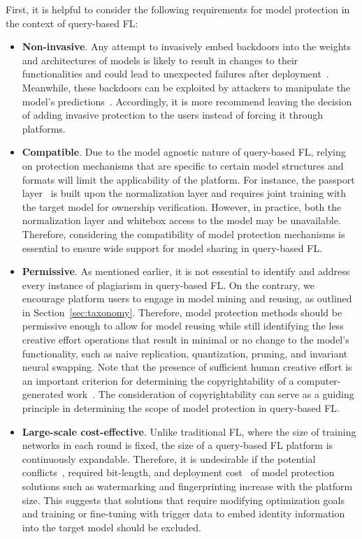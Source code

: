 First, it is helpful to consider the following requirements for model protection in the context of query-based FL:
\begin{itemize}
  \item \textbf{Non-invasive}. Any attempt to invasively embed backdoors into the weights and architectures of models is likely to result in changes to their functionalities and could lead to unexpected failures after deployment~\cite{chen2022copy}. 
  Meanwhile, these backdoors can be exploited by attackers to manipulate the model's predictions~\cite{li2022untargeted}.
  Accordingly, it is more recommend leaving the decision of adding invasive protection to the users instead of forcing it through platforms.
  
  \item \textbf{Compatible}. %
  Due to the model agnostic nature of query-based FL, relying on protection mechanisms that are specific to certain model structures and formats will limit the applicability of the platform.
  For instance, the passport layer~\cite{zhang2020passport} is built upon the normalization layer and requires joint training with the target model for ownership verification.
  However, in practice, both the normalization layer and whitebox access to the model may be unavailable.
  Therefore, considering the compatibility of model protection mechanisms is essential to ensure wide support for model sharing in query-based FL.

  \item \textbf{Permissive}. %
  As mentioned earlier, it is not essential to identify and address every instance of plagiarism in query-based FL. 
  On the contrary, we encourage platform users to engage in model mining and reusing, as outlined in Section~\ref{sec:taxonomy}. 
  Therefore, model protection methods should be permissive enough to allow for model reusing while still identifying the less creative effort operations that result in minimal or no change to the model's functionality, such as naive replication, quantization, pruning, and invariant neural swapping.
  Note that the presence of sufficient human creative effort is an important criterion for determining the copyrightability of a computer-generated work~\cite{national1979final}.
  The consideration of copyrightability can serve as a guiding principle in determining the scope of model protection in query-based FL.

  \item \textbf{Large-scale cost-effective}.
  Unlike traditional FL, where the size of training networks in each round is fixed, the size of a query-based FL platform is continuously expandable. 
  Therefore, it is undesirable if the potential conflicts~\cite{li2023fedipr}, required bit-length, and deployment cost~\cite{uchida2017embedding, darvish2019deepsigns} of model protection solutions such as watermarking and fingerprinting increase with the platform size.
  This suggests that solutions that require modifying optimization goals and training or fine-tuning with trigger data to embed identity information into the target model should be excluded.

\end{itemize}

